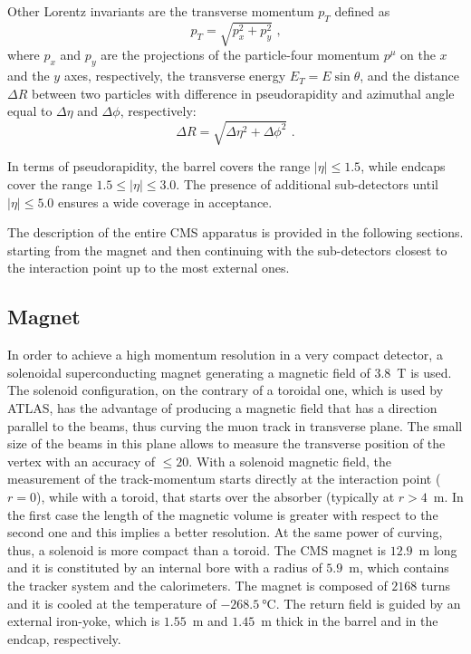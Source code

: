 Other Lorentz invariants are the transverse momentum $p_T$ defined as
\begin{equation}
p_T=\sqrt{p^2_x+p^2_y}\mbox{ ,}
\end{equation}
where $p_x$ and $p_y$ are the projections of the particle-four momentum $p^\mu$ on the $x$ and the $y$ axes, 
respectively, the transverse energy $E_T=E\sin\theta$, and the distance $\Delta R$ between two particles with difference in 
pseudorapidity and azimuthal angle equal to $\Delta\eta$ and $\Delta\phi$, respectively:
\begin{equation}
\Delta R=\sqrt{ \Delta\eta^2 + \Delta\phi^2 }\mbox{ .}
\end{equation}

In terms of pseudorapidity, the barrel covers the range $|\eta|\le1.5$, 
while endcaps cover the range $1.5\le|\eta|\le3.0$. The presence of
additional sub-detectors until $|\eta|\le5.0$ ensures a wide coverage in acceptance.  

The description of the entire CMS apparatus is provided in the following sections.
starting from the magnet and then continuing with the sub-detectors closest to the
 interaction point up to the most external ones.
 
\subsection{Magnet}
\label{subsec:magnet}

In order to achieve a high momentum resolution in a very compact detector,
a solenoidal superconducting magnet generating a magnetic field of 3.8~\si{\tesla} is used. 
The solenoid configuration, on the contrary of a toroidal one, which is used by ATLAS,
has the advantage of producing a magnetic field that has a direction 
parallel to the beams, thus curving the muon track in transverse plane. 
The small size of the beams in this plane allows to measure the transverse 
position of the vertex with an accuracy of $\le20$\si{\mum}. 
With a solenoid magnetic field, the measurement of the track-momentum starts directly 
at the interaction point ($r=0$), while with a toroid, that starts over the absorber (typically at $r>4$~\si{\metre}.
In the first case the length of the magnetic volume is greater with respect
to the second one and this implies a better resolution. 
At the same power of curving, thus, a solenoid is more compact than a toroid.
The CMS magnet is $12.9$~\si{\metre} long and it is constituted by an internal bore
with a radius of $5.9$~\si{\metre}, which contains the tracker system and
the calorimeters. The magnet is composed of $2168$ turns and it is cooled
at the temperature of $-268.5~\si{\degreeCelsius}$. The return field is guided
by an external iron-yoke, which is $1.55$~\si{\metre} and $1.45$~\si{\metre} thick
in the barrel and in the endcap, respectively.

